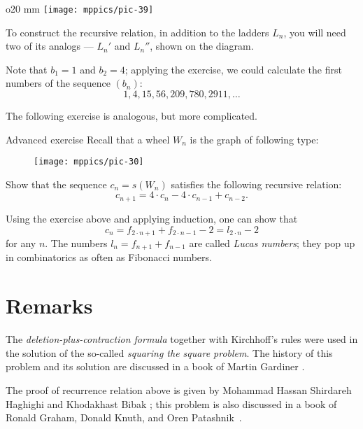 \begin{wrapfigure}{o}{20 mm}
\vskip-4mm
\centering
\texttt{[image: mppics/pic-39]}
\end{wrapfigure}

 To construct the recursive relation, in addition to the ladders $L_n$, you will need two of its analogs --- $L_n'$ and $L_n''$, shown on the diagram.

\medskip

Note that $b_1=1$ and $b_2=4$; applying the exercise, we could calculate the first numbers of the sequence $(b_n)$:
\[1,4,15,56,209,780,2911,\dots \]

The following exercise is analogous, but more complicated.

\begin{thm}{Advanced exercise}
Recall that a wheel $W_n$ is the graph of following type:

\begin{figure}[h!]
\centering
\texttt{[image: mppics/pic-30]}
\end{figure}

Show that the sequence $c_n=s(W_n)$ satisfies the following recursive relation:
\[c_{n+1}=4\cdot c_n-4\cdot c_{n-1}+c_{n-2}.\]

\end{thm}

Using the exercise above and applying induction, one can show that 
\[c_n=f_{2\cdot n+1}+f_{2\cdot n-1}-2=l_{2\cdot  n}-2\]
for any $n$.
The numbers $l_n=f_{n+1}+f_{n-1}$ are called \emph{Lucas numbers};
they pop up in combinatorics as often as Fibonacci numbers.  

\section*{Remarks}

The \emph{deletion-plus-contraction formula} together with Kirchhoff's rules were used in the solution of the so-called \emph{squaring the square problem}.
The history of this problem and its solution are discussed in a book of Martin Gardiner \cite[Chapter 17]{gardiner}.

The proof of recurrence relation above is given by Mohammad Hassan Shirdareh Haghighi and Khodakhast Bibak \cite{shirdareh-haghighi-bibak};
this problem is also discussed in a book of Ronald Graham, Donald Knuth, and Oren Patashnik~\cite{graham-knuth-patashnik}.
